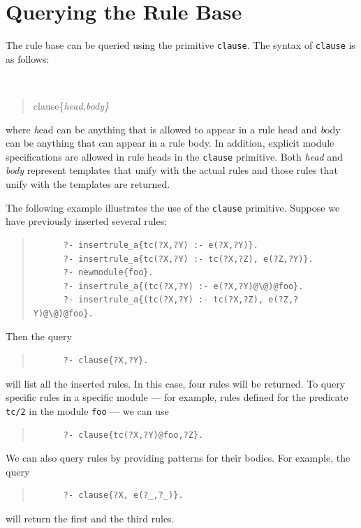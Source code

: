 \documentclass[11pt]{article}
\begin{document}
\section{Querying the Rule Base}
\label{sec:clause}

The rule base can be queried using the primitive {\tt clause}.  The
  syntax of {\tt clause} is as follows:

{\tt
\begin{quote}
clause\{\it{head,body}\}
\end{quote}
}
\noindent
where {\emph head} can be anything that is allowed to appear in a rule
head and {\emph body} can be anything that
can appear in a rule body. In addition, explicit module specifications are
allowed in rule heads in the {\tt clause} primitive. 
Both \emph{head} and \emph{body} represent
templates that unify with the actual rules and those rules that unify
with the templates are returned.

The following example illustrates the use of the {\tt clause} primitive.
Suppose we have previously inserted several rules:
\begin{quote}
\begin{verbatim}
      ?- insertrule_a{tc(?X,?Y) :- e(?X,?Y)}.
      ?- insertrule_a{tc(?X,?Y) :- tc(?X,?Z), e(?Z,?Y)}.
      ?- newmodule{foo}.
      ?- insertrule_a{(tc(?X,?Y) :- e(?X,?Y)@\@)@foo}.
      ?- insertrule_a{(tc(?X,?Y) :- tc(?X,?Z), e(?Z,?Y)@\@)@foo}.
\end{verbatim}
\end{quote}

Then the query
\begin{quote}
\begin{verbatim}
      ?- clause{?X,?Y}.
\end{verbatim}
\end{quote}
\noindent
will list all the inserted rules.  In this case, four rules will be
returned.  To query specific rules in a specific module --- for example,
rules defined for the predicate {\tt tc/2} in the module {\tt foo} --- we
can use
\begin{quote}
\begin{verbatim}
      ?- clause{tc(?X,?Y)@foo,?Z}.
\end{verbatim}
\end{quote}
We can also query rules by providing patterns for their bodies. For
example, the query
\begin{quote}
\begin{verbatim}
      ?- clause{?X, e(?_,?_)}.
\end{verbatim}
\end{quote}
\noindent
will return the first and the third rules.
\end{document}
